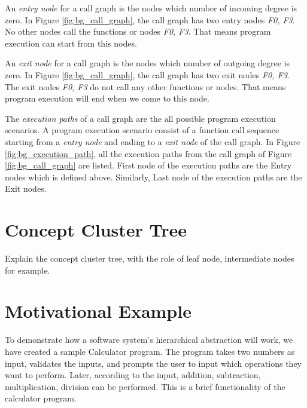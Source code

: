 An \emph{entry node} for a call graph is the nodes which number of incoming degree is zero. In Figure \ref{fig:bg_call_graph}, the call graph has two entry nodes \emph{F0, F3}. No other nodes call the functions or nodes \emph{F0, F3}. That means program execution can start from this nodes.

An \emph{exit node} for a call graph is the nodes which number of outgoing degree is zero. In Figure \ref{fig:bg_call_graph}, the call graph has two exit nodes \emph{F0, F3}. The exit nodes \emph{F0, F3} do not call any other functions or nodes. That means program execution will end when we come to this node.


The \emph{execution paths} of a call graph are the all possible program execution scenarios. A program execution scenario consist of a function call sequence starting from a \emph{entry node} and ending to a \emph{exit node} of the call graph. In Figure \ref{fig:bg_execution_path}, all the execution paths from the call graph of Figure \ref{fig:bg_call_graph} are listed. First node of the execution paths are the Entry nodes which is defined above. Similarly, Last node of the execution paths are the Exit nodes. 




\section{Concept Cluster Tree}
Explain the concept cluster tree, with the role of leaf node, intermediate nodes for example. 

\section{Motivational Example}
\label{motive}
To demonstrate how a software system's hierarchical abstraction will work, we have created a sample Calculator program. The program takes two numbers as input, validates the inputs, and prompts the user to input which operations they want to perform. Later, according to the input, addition, subtraction, multiplication, division can be performed. This is a brief functionality of the calculator program. 

